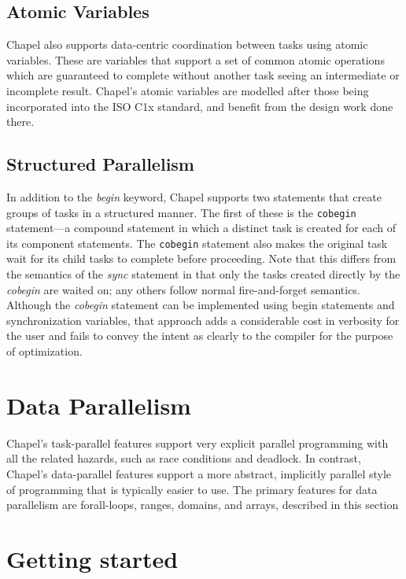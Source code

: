 \documentclass[letterpaper]{article}
\begin{document}
\subsection{Atomic Variables}

Chapel also supports data-centric coordination between tasks using atomic variables. These are variables that support a set of common atomic operations which are guaranteed to complete without another task seeing an intermediate or incomplete result. Chapel’s atomic variables are modelled after those being incorporated into the ISO C1x standard, and benefit from the design work done there.

\subsection{Structured Parallelism}
In addition to the \textit{begin} keyword, Chapel supports two statements that create groups of
tasks in a structured manner. The first of these is the \texttt{cobegin} 
statement—a compound statement in which a distinct task is created for each of its component statements.  The \texttt{cobegin} statement also makes the original task wait for its child tasks to complete before proceeding.  Note that this differs from the semantics of the \textit{sync} statement in that
only the tasks created directly by the \textit{cobegin} are waited on;  any others follow normal fire-and-forget semantics. Although the \textit{cobegin} statement can be implemented using begin 
statements and synchronization variables, that approach adds a considerable cost in verbosity for the user and fails to convey the intent as clearly to the compiler for the purpose of optimization.

\section{Data Parallelism}
Chapel’s task-parallel features support very explicit parallel programming with all the related hazards, such as race conditions and deadlock.  In contrast, Chapel’s data-parallel features support a more abstract, implicitly parallel style of programming that is typically easier to use.   The primary features for data parallelism are forall-loops,  ranges, domains, and arrays, described in this section
 




\section{Getting started}
\end{document}
